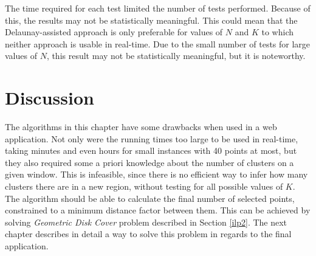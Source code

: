 The time required for each test limited the number of tests performed. Because of this, the results may not be statistically meaningful. 
This could mean that the Delaunay-assisted approach is only preferable for values of $N$ and $K$ to which neither approach is usable in real-time. Due to the small number of tests for large values of $N$, this result may not be statistically meaningful, but it is noteworthy.

\section{Discussion}
The algorithms in this chapter have some drawbacks when used in a web application. Not only were the running times too large to be used in real-time, taking minutes and even hours for small instances with 40 points at most, but they also required some a priori knowledge about the number of clusters on a given window. This is infeasible, since there is no efficient way to infer how many clusters there are in a new region, without testing for all possible values of $K$. The algorithm should be able to calculate the final number of selected points, constrained to a minimum distance factor between them. This can be achieved by solving \emph{Geometric Disk Cover} problem described in Section \ref{ilp2}. The next chapter describes in detail a way to solve this problem in regards to the final application.
